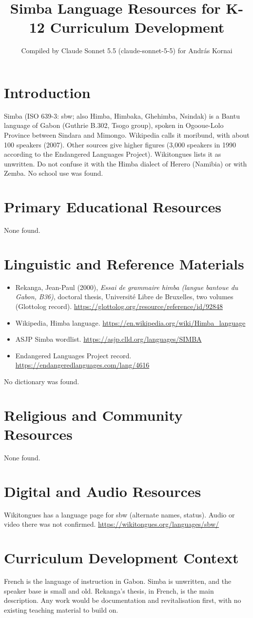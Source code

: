 \documentclass[12pt]{article}
\title{Simba Language Resources for K-12 Curriculum Development}
\author{Compiled by Claude Sonnet 5.5 (claude-sonnet-5-5) for Andr\'as Kornai}
\date{}
\begin{document}
\maketitle

\section{Introduction}
Simba (ISO 639-3: sbw; also Himba, Himbaka, Ghehimba, Nsindak) is a Bantu language of Gabon (Guthrie B.302, Tsogo group), spoken in Ogooue-Lolo Province between Sindara and Mimongo. Wikipedia calls it moribund, with about 100 speakers (2007). Other sources give higher figures (3,000 speakers in 1990 according to the Endangered Languages Project). Wikitongues lists it as unwritten. Do not confuse it with the Himba dialect of Herero (Namibia) or with Zemba. No school use was found.

\section{Primary Educational Resources}
None found.

\section{Linguistic and Reference Materials}
\begin{itemize}
\item Rekanga, Jean-Paul (2000), \emph{Essai de grammaire himba (langue bantoue du Gabon, B36)}, doctoral thesis, Universit\'e Libre de Bruxelles, two volumes (Glottolog record). \url{https://glottolog.org/resource/reference/id/92848}
\item Wikipedia, Himba language. \url{https://en.wikipedia.org/wiki/Himba_language}
\item ASJP Simba wordlist. \url{https://asjp.clld.org/languages/SIMBA}
\item Endangered Languages Project record. \url{https://endangeredlanguages.com/lang/4616}
\end{itemize}
No dictionary was found.

\section{Religious and Community Resources}
None found.

\section{Digital and Audio Resources}
Wikitongues has a language page for sbw (alternate names, status). Audio or video there was not confirmed. \url{https://wikitongues.org/languages/sbw/}

\section{Curriculum Development Context}
French is the language of instruction in Gabon. Simba is unwritten, and the speaker base is small and old. Rekanga's thesis, in French, is the main description. Any work would be documentation and revitalisation first, with no existing teaching material to build on.
\end{document}
